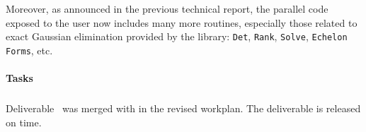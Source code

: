 Moreover, as announced in the previous technical report, the parallel
code exposed to the user now includes many more routines, especially
those related to exact Gaussian elimination provided by the
\fflasffpack library: \texttt{Det}, \texttt{Rank}, \texttt{Solve},
\texttt{Echelon Forms}, etc.


\paragraph{Tasks}

\medskip
\subparagraph{}
Deliverable~ was merged with
 in the revised workplan. The deliverable
 is released on time.

